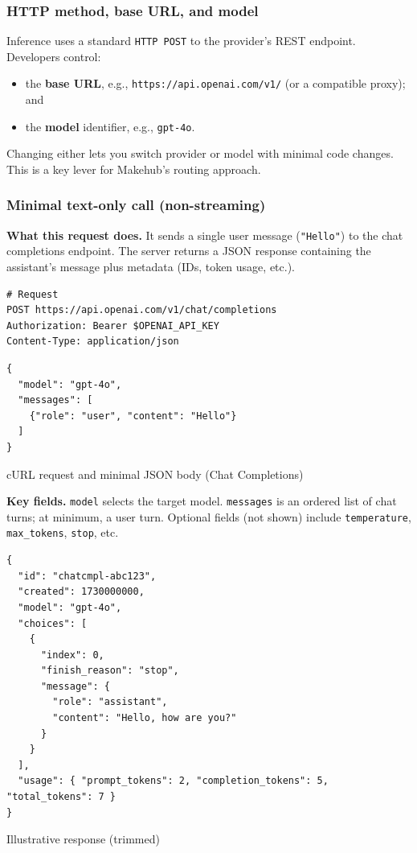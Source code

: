 \documentclass[english]{article}
\begin{document}
\subsubsection{HTTP method, base URL, and model}

Inference uses a standard \texttt{HTTP POST} to the provider's REST endpoint. Developers control:
\begin{itemize}
  \item the \textbf{base URL}, e.g., \texttt{https://api.openai.com/v1/} (or a compatible proxy); and
  \item the \textbf{model} identifier, e.g., \texttt{gpt-4o}.
\end{itemize}
Changing either lets you switch provider or model with minimal code changes. This is a key lever for Makehub's routing approach.

\subsubsection{Minimal text-only call (non-streaming)}

\noindent\textbf{What this request does.}
It sends a single user message (\texttt{"Hello"}) to the chat completions endpoint. The server returns a JSON response containing the assistant's message plus metadata (IDs, token usage, etc.).

\begin{listing}[H]
\begin{verbatim}
# Request
POST https://api.openai.com/v1/chat/completions
Authorization: Bearer $OPENAI_API_KEY
Content-Type: application/json
\end{verbatim}
\begin{verbatim}
{
  "model": "gpt-4o",
  "messages": [
    {"role": "user", "content": "Hello"}
  ]
}
\end{verbatim}
\caption{cURL request and minimal JSON body (Chat Completions)}
\end{listing}

\noindent\textbf{Key fields.}
\texttt{model} selects the target model. \texttt{messages} is an ordered list of chat turns; at minimum, a user turn. Optional fields (not shown) include \texttt{temperature}, \texttt{max\_tokens}, \texttt{stop}, etc.

\begin{listing}[H]
\begin{verbatim}
{
  "id": "chatcmpl-abc123",
  "created": 1730000000,
  "model": "gpt-4o",
  "choices": [
    {
      "index": 0,
      "finish_reason": "stop",
      "message": {
        "role": "assistant",
        "content": "Hello, how are you?"
      }
    }
  ],
  "usage": { "prompt_tokens": 2, "completion_tokens": 5, "total_tokens": 7 }
}
\end{verbatim}
\caption{Illustrative response (trimmed)}
\end{listing}
\end{document}
